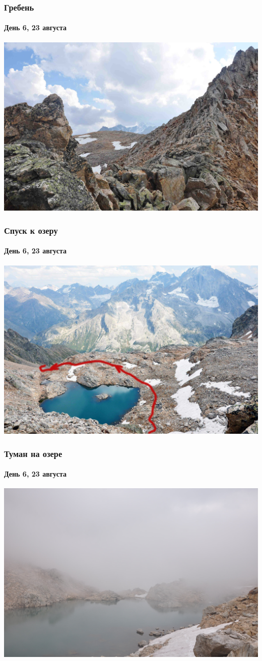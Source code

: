\begin{frame}
	\frametitle{Гребень}
	\framesubtitle{День 6, 23 августа}
	\centering
	\includegraphics[width=\textwidth]{../pics/DSC_0047}			
\end{frame}

\begin{frame}
	\frametitle{Спуск к озеру}
	\framesubtitle{День 6, 23 августа}
	\centering
	\includegraphics[width=\textwidth]{../pics/DSC_0041}			
\end{frame}


\begin{frame}
	\frametitle{Туман на озере}
	\framesubtitle{День 6, 23 августа}
	\centering
	\includegraphics[width=\textwidth]{../pics/DSC_0089}			
\end{frame}

